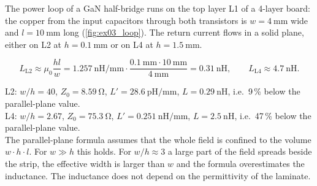 


The power loop of a GaN half-bridge runs on the top layer L1 of a 4-layer board: the copper from the input capacitors through both transistors is $w=\SI{4}{\milli\metre}$ wide and $l=\SI{10}{\milli\metre}$ long (\autoref{fig:ex03_loop}). The return current flows in a solid plane, either on L2 at $h=\SI{0.1}{\milli\metre}$ or on L4 at $h=\SI{1.5}{\milli\metre}$.




\begin{solutionblock}
	\begin{equation}
		L_\mathrm{L2} \approx \mu_0\frac{hl}{w} = \SI{1.257}{\nano\henry\per\milli\metre}\cdot\frac{\SI{0.1}{\milli\metre}\cdot\SI{10}{\milli\metre}}{\SI{4}{\milli\metre}} = \SI{0.31}{\nano\henry},\qquad
		L_\mathrm{L4} \approx \SI{4.7}{\nano\henry}.
	\end{equation}
\end{solutionblock}


\begin{solutionblock}
	L2: $w/h=40$, $Z_0=\SI{8.59}{\ohm}$, $L'=\SI{28.6}{\pico\henry\per\milli\metre}$, $L=\SI{0.29}{\nano\henry}$, i.e.\ 9\,\% below the parallel-plane value.\\
	L4: $w/h=2.67$, $Z_0=\SI{75.3}{\ohm}$, $L'=\SI{0.251}{\nano\henry\per\milli\metre}$, $L=\SI{2.5}{\nano\henry}$, i.e.\ 47\,\% below the parallel-plane value.\\
	The parallel-plane formula assumes that the whole field is confined to the volume $w\cdot h\cdot l$. For $w\gg h$ this holds. For $w/h\approx3$ a large part of the field spreads beside the strip, the effective width is larger than $w$ and the formula overestimates the inductance. The inductance does not depend on the permittivity of the laminate.
\end{solutionblock}

